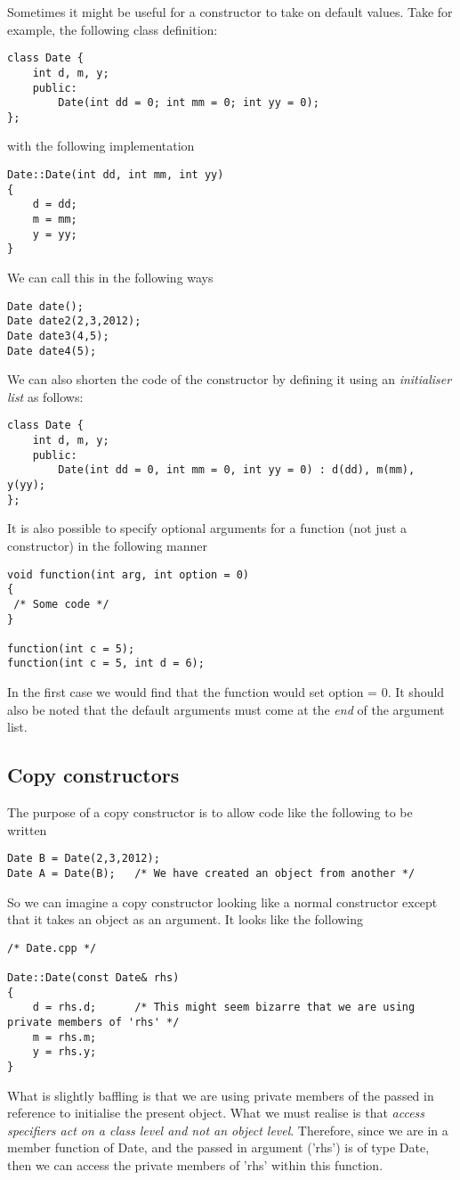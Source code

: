 Sometimes it might be useful for a constructor to take on default values. Take for example, the following class definition:
\begin{lstlisting}
class Date {
	int d, m, y;
	public:
		Date(int dd = 0; int mm = 0; int yy = 0);
};
\end{lstlisting}
with the following implementation
\begin{verbatim}
Date::Date(int dd, int mm, int yy)
{
	d = dd;
	m = mm;
	y = yy;
}
\end{verbatim}
We can call this in the following ways
\begin{verbatim}
Date date();
Date date2(2,3,2012);
Date date3(4,5);
Date date4(5);
\end{verbatim}

We can also shorten the code of the constructor by defining it using an \emph{initialiser list} as follows:
\begin{verbatim}
class Date {
	int d, m, y;
	public:
		Date(int dd = 0, int mm = 0, int yy = 0) : d(dd), m(mm), y(yy);
};
\end{verbatim}

It is also possible to specify optional arguments for a function (not just a constructor) in the following manner
\begin{lstlisting}
void function(int arg, int option = 0)
{
 /* Some code */
}

function(int c = 5);
function(int c = 5, int d = 6);
\end{lstlisting}
In the first case we would find that the function would set option = 0. It should also be noted that the default arguments must come at the \emph{end} of the argument list.

\subsection{Copy constructors}

The purpose of a copy constructor is to allow code like the following to be written
\begin{lstlisting}
Date B = Date(2,3,2012);
Date A = Date(B); 	/* We have created an object from another */
\end{lstlisting}
So we can imagine a copy constructor looking like a normal constructor except that it takes an object as an argument. It looks like the following
\begin{lstlisting}
/* Date.cpp */

Date::Date(const Date& rhs)
{
	d = rhs.d;		/* This might seem bizarre that we are using private members of 'rhs' */
	m = rhs.m;
	y = rhs.y;
}
\end{lstlisting}
What is slightly baffling is that we are using private members of the passed in reference to initialise the present object. What we must realise is that \emph{access specifiers act on a class level and not an object level}. Therefore, since we are in a member function of Date, and the passed in argument ('rhs') is of type Date, then we can access the private members of 'rhs' within this function. 


